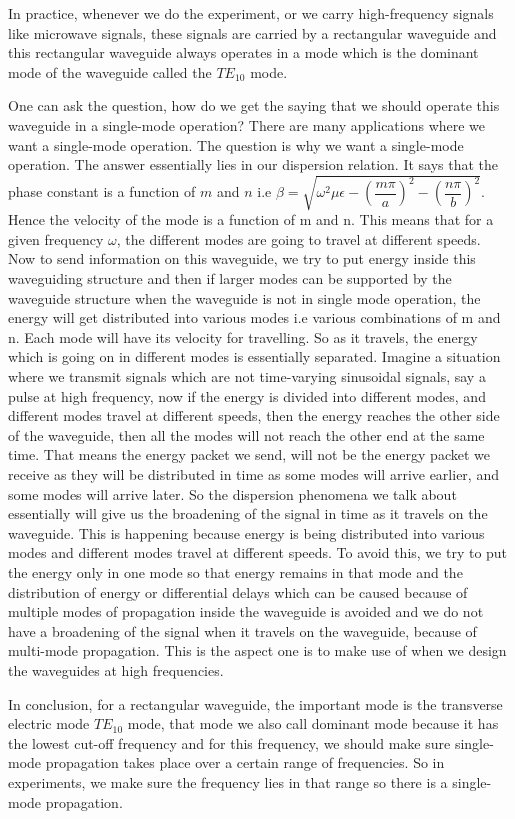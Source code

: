 In practice, whenever we do the experiment, or we carry high-frequency signals like microwave signals, these signals are carried by a rectangular waveguide and this rectangular waveguide always operates in a mode which is the dominant mode of the waveguide called the $TE_{10}$ mode.

One can ask the question, how do we get the saying that we should operate this waveguide in a single-mode operation? There are many applications where we want a single-mode operation. The question is why we want a single-mode operation. The answer essentially lies in our dispersion relation. It says that the phase constant is a function of $m$ and $n$ i.e $\beta = \sqrt{{\omega}^2\mu\epsilon - \left(\dfrac{m\pi}{a}\right)^2 - \left(\dfrac{n\pi}{b}\right)^2}.$ Hence the velocity of the mode is a function of m and n. This means that for a given frequency $\omega$, the different modes are going to travel at different speeds. Now to send information on this waveguide, we try to put energy inside this waveguiding structure and then if larger modes can be supported by the waveguide structure when the waveguide is not in single mode operation, the energy will get distributed into various modes i.e various combinations of m and n. Each mode will have its velocity for travelling. So as it travels, the energy which is going on in different modes is essentially separated. Imagine a situation where we transmit signals which are not time-varying sinusoidal signals, say a pulse at high frequency, now if the energy is divided into different modes, and different modes travel at different speeds, then the energy reaches the other side of the waveguide, then all the modes will not reach the other end at the same time. That means the energy packet we send, will not be the energy packet we receive as they will be distributed in time as some modes will arrive earlier, and some modes will arrive later. So the dispersion phenomena we talk about essentially will give us the broadening of the signal in time as it travels on the waveguide. This is happening because energy is being distributed into various modes and different modes travel at different speeds. To avoid this, we try to put the energy only in one mode so that energy remains in that mode and the distribution of energy or differential delays which can be caused because of multiple modes of propagation inside the waveguide is avoided and we do not have a broadening of the signal when it travels on the waveguide, because of multi-mode propagation. This is the aspect one is to make use of when we design the waveguides at high frequencies.

In conclusion, for a rectangular waveguide, the important mode is the transverse electric mode $TE_{10}$ mode, that mode we also call dominant mode because it has the lowest cut-off frequency and for this frequency, we should make sure single-mode propagation takes place over a certain range of frequencies. So in experiments, we make sure the frequency lies in that range so there is a single-mode propagation.